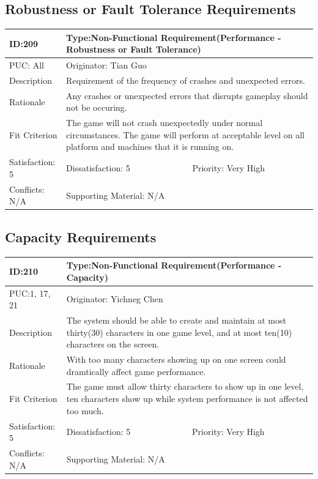 \documentclass{article}
\begin{document}
\subsection{Robustness or Fault Tolerance Requirements}
\begin{table}[H]
    \begin{tabular}{|l|l|l|}
    \hline
    ID:209 & \multicolumn{2}{l|}{Type:Non-Functional Requirement(Performance - Robustness or Fault Tolerance)} \\ \hline
    PUC: All & \multicolumn{2}{l|}{Originator: Tian Guo} \\ \hline
    Description & \multicolumn{2}{m{0.85\textwidth}|}{Requirement of the frequency of crashes and unexpected errors.} \\ \hline
    Rationale & \multicolumn{2}{m{0.85\textwidth}|}{Any crashes or unexpected errors that disrupts gameplay should not be occuring.} \\ \hline
    Fit Criterion & \multicolumn{2}{m{0.85\textwidth}|}{The game will not crash unexpectedly under normal circumstances. The game will perform at acceptable level on all platform and machines that it is running on.} \\ \hline
    Satisfaction: 5 & Dissatisfaction: 5 & Priority: Very High \\ \hline
    Conflicts: N/A & \multicolumn{2}{l|}{Supporting Material: N/A} \\ \hline
    \end{tabular}
    \end{table}

\subsection{Capacity Requirements}
\begin{table}[H]
    \begin{tabular}{|l|l|l|}
    \hline
    ID:210 & \multicolumn{2}{l|}{Type:Non-Functional Requirement(Performance - Capacity)} \\ \hline
    PUC:1, 17, 21 & \multicolumn{2}{l|}{Originator: Yichneg Chen} \\ \hline
    Description & \multicolumn{2}{m{0.85\textwidth}|}{The system should be able to create and maintain at most thirty(30) characters in one game level, and at most ten(10) characters on the screen.} \\ \hline
    Rationale & \multicolumn{2}{m{0.85\textwidth}|}{With too many characters showing up on one screen could dramtically affect game performance.} \\ \hline
    Fit Criterion & \multicolumn{2}{m{0.85\textwidth}|}{The game must allow thirty characters to show up in one level, ten characters show up while system performance is not affected too much.} \\ \hline
    Satisfaction: 5 & Dissatisfaction: 5 & Priority: Very High \\ \hline
    Conflicts: N/A & \multicolumn{2}{l|}{Supporting Material: N/A} \\ \hline
    \end{tabular}
    \end{table}
\end{document}

